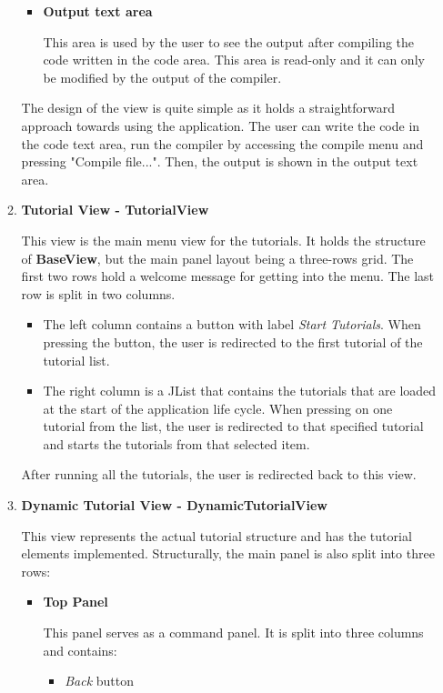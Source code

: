 \documentclass[12pt,a4paper,twoside]{report}
\begin{document}
\begin{enumerate}
\begin{enumerate}
\begin {itemize}
 \item \textbf{Output text area}
 
 This area is used by the user to see the output after compiling the code written in the code area. This area is read-only and it can only be modified by the output of the compiler. 
 \end {itemize}

 The design of the view is quite simple as it holds a straightforward approach towards using the application. The user can write the code in the code text area, run the compiler by accessing the compile menu and pressing "Compile file...". Then, the output is shown in the output text area. 
 
 \item \textbf{Tutorial View - TutorialView}
 
 This view is the main menu view for the tutorials. It holds the structure of \textbf{BaseView}, but the main panel layout being a three-rows grid. The first two rows hold a welcome message for getting into the menu. The last row is split in two columns.
 \begin{itemize}
  \item The left column contains a button with label \textit{Start Tutorials}. When pressing the button, the user is redirected to the first tutorial of the tutorial list.
  \item The right column is a JList that contains the tutorials that are loaded at the start of the application life cycle. When pressing on one tutorial from the list, the user is redirected to that specified tutorial and starts the tutorials from that selected item. 
 \end{itemize}
 
 After running all the tutorials, the user is redirected back to this view.
 
 \item \textbf{Dynamic Tutorial View - DynamicTutorialView}
 
 This view represents the actual tutorial structure and has the tutorial elements implemented. Structurally, the main panel is 
 also split into three rows:
 \begin{itemize}
 \item \textbf{Top Panel}
 
 This panel serves as a command panel. It is split into three columns and contains:
 \begin{itemize}
    \item \textit{Back} button 
        

\end{itemize}
\end{itemize}
\end{enumerate}
\end{enumerate}
\end{document}
